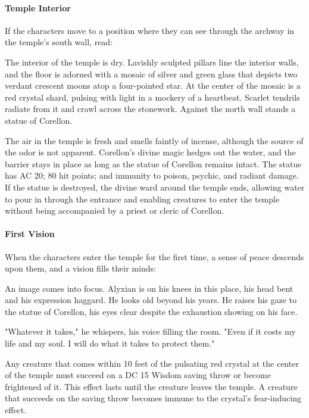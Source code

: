 \documentclass[10pt,a4paper,twoside,bg=print,twocolumn,openany,nodeprecatedcode]{dndbook}
\begin{document}
\paragraph{Temple Interior}
If the characters move to a position where they can see through the archway in the temple's south wall, read:

\begin{DndReadAloud}{}
The interior of the temple is dry. Lavishly sculpted pillars line the interior walls, and the floor is adorned with a mosaic of silver and green glass that depicts two verdant crescent moons atop a four-pointed star. At the center of the mosaic is a red crystal shard, pulsing with light in a mockery of a heartbeat. Scarlet tendrils radiate from it and crawl across the stonework. Against the north wall stands a statue of Corellon.

\end{DndReadAloud}

The air in the temple is fresh and smells faintly of incense, although the source of the odor is not apparent. Corellon's divine magic hedges out the water, and the barrier stays in place as long as the statue of Corellon remains intact. The statue has AC 20; 80 hit points; and immunity to poison, psychic, and radiant damage. If the statue is destroyed, the divine ward around the temple ends, allowing water to pour in through the entrance and enabling creatures to enter the temple without being accompanied by a priest or cleric of Corellon.

\paragraph{First Vision}
When the characters enter the temple for the first time, a sense of peace descends upon them, and a vision fills their minds:

\begin{DndReadAloud}{}
An image comes into focus. Alyxian is on his knees in this place, his head bent and his expression haggard. He looks old beyond his years. He raises his gaze to the statue of Corellon, his eyes clear despite the exhaustion showing on his face.

"Whatever it takes," he whispers, his voice filling the room. "Even if it costs my life and my soul. I will do what it takes to protect them."

\end{DndReadAloud}

Any creature that comes within 10 feet of the pulsating red crystal at the center of the temple must succeed on a DC 15 Wisdom saving throw or become frightened of it. This effect lasts until the creature leaves the temple. A creature that succeeds on the saving throw becomes immune to the crystal's fear-inducing effect.
\end{document}
